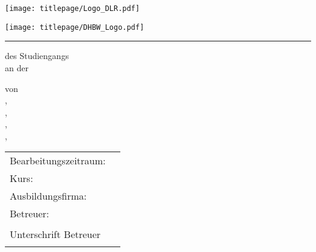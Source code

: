 \begin{titlepage}

	\begin{minipage}{.45\textwidth}
		\texttt{[image: titlepage/Logo\_DLR.pdf]}
	\end{minipage}
	\hfill
	\begin{minipage}{.45\textwidth}
		\begin{flushright}
			\texttt{[image: titlepage/DHBW\_Logo.pdf]}
		\end{flushright}
	\end{minipage}
	
	\rule{.95\textwidth}{.5pt}
	
	\vspace{1.5cm}
	
	\centering
	
	\large{\textbf{\thema}}
	\vspace{0.5cm}
	
	\large{\titel}
	
	des Studiengangs \studiengang\\
	an der \dhbw
	\vspace{0.5cm}

	von\\
	\autorA, \matrikelnrA\\
	\autorB, \matrikelnrB\\
	\autorC, \matrikelnrC\\
	\autorD, \matrikelnrD\\
	\vspace{0.5cm}
	
	\abgabe				

	\vfill
	
	\small
	\begin{tabularx}{\linewidth}{@{}lX@{}}
		\toprule
		Bearbeitungszeitraum: & \praxis\\
		Kurs: & \jahrgang\\
		Ausbildungsfirma: & \dlr\\
		Betreuer: & \betreuer\\
		Unterschrift Betreuer & \rule[-.5cm]{.5\columnwidth}{.5pt}
	\end{tabularx}		
\end{titlepage}